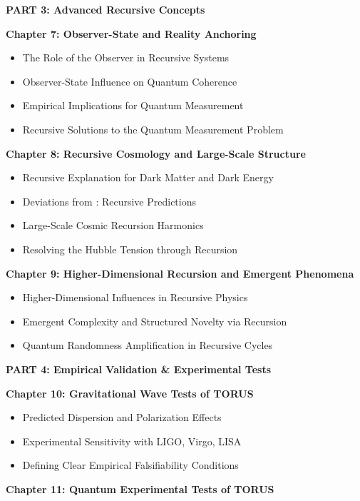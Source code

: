 \documentclass[
]{article}
\begin{document}
\textbf{PART 3: Advanced Recursive Concepts}

\textbf{Chapter 7: Observer-State and Reality Anchoring}

\begin{itemize}
\item
  The Role of the Observer in Recursive Systems
\item
  Observer-State Influence on Quantum Coherence
\item
  Empirical Implications for Quantum Measurement
\item
  Recursive Solutions to the Quantum Measurement Problem
\end{itemize}

\textbf{Chapter 8: Recursive Cosmology and Large-Scale Structure}

\begin{itemize}
\item
  Recursive Explanation for Dark Matter and Dark Energy
\item
  Deviations from \LambdaCDM: Recursive Predictions
\item
  Large-Scale Cosmic Recursion Harmonics
\item
  Resolving the Hubble Tension through Recursion
\end{itemize}

\textbf{Chapter 9: Higher-Dimensional Recursion and Emergent Phenomena}

\begin{itemize}
\item
  Higher-Dimensional Influences in Recursive Physics
\item
  Emergent Complexity and Structured Novelty via Recursion
\item
  Quantum Randomness Amplification in Recursive Cycles
\end{itemize}

\textbf{PART 4: Empirical Validation \& Experimental Tests}

\textbf{Chapter 10: Gravitational Wave Tests of TORUS}

\begin{itemize}
\item
  Predicted Dispersion and Polarization Effects
\item
  Experimental Sensitivity with LIGO, Virgo, LISA
\item
  Defining Clear Empirical Falsifiability Conditions
\end{itemize}

\textbf{Chapter 11: Quantum Experimental Tests of TORUS}
\end{document}
